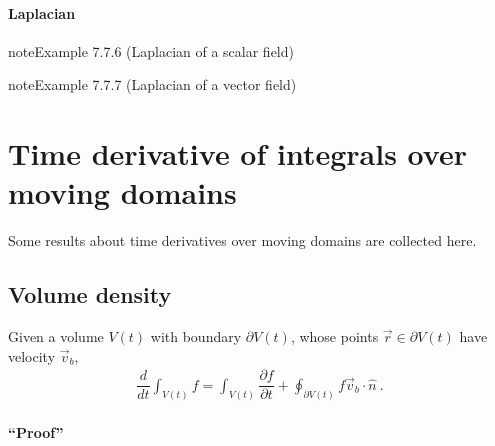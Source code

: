 \documentclass[letterpaper,10pt,english]{jupyterBook}
\begin{document}
\subsubsection{Laplacian}
\label{\detokenize{ch/tensor-algebra-calculus/calculus-euclidean-spherical:laplacian}}\label{\detokenize{ch/tensor-algebra-calculus/calculus-euclidean-spherical:tensor-calculus-spherical-differential-operators-laplacian}}\label{ch/tensor-algebra-calculus/calculus-euclidean-spherical:example-5}
\begin{sphinxadmonition}{note}{Example 7.7.6 (Laplacian of a scalar field)}


\end{sphinxadmonition}
\label{ch/tensor-algebra-calculus/calculus-euclidean-spherical:example-6}
\begin{sphinxadmonition}{note}{Example 7.7.7 (Laplacian of a vector field)}


\end{sphinxadmonition}

\sphinxstepscope


\chapter{Time derivative of integrals over moving domains}
\label{\detokenize{ch/tensor-algebra-calculus/time-derivative-of-integrals:time-derivative-of-integrals-over-moving-domains}}\label{\detokenize{ch/tensor-algebra-calculus/time-derivative-of-integrals:tensor-calculus-time-derivative-of-integrals}}\label{\detokenize{ch/tensor-algebra-calculus/time-derivative-of-integrals::doc}}
\sphinxAtStartPar
Some results about time derivatives over moving domains are collected here.


\section{Volume density}
\label{\detokenize{ch/tensor-algebra-calculus/time-derivative-of-integrals:volume-density}}\label{\detokenize{ch/tensor-algebra-calculus/time-derivative-of-integrals:tensor-calculus-time-derivative-of-integrals-volume-density}}
\sphinxAtStartPar
{}
Given a volume \(V(t)\) with boundary \(\partial V(t)\), whose points \(\vec{r} \in \partial V(t)\) have velocity \(\vec{v}_b\),
\begin{equation*}
\begin{split}\dfrac{d}{dt} \int_{V(t)} f = \int_{V(t)} \dfrac{\partial f}{\partial t} + \oint_{\partial V(t)} f \vec{v}_b \cdot \hat{n} \ .\end{split}
\end{equation*}\subsubsection*{“Proof”}
\end{document}
